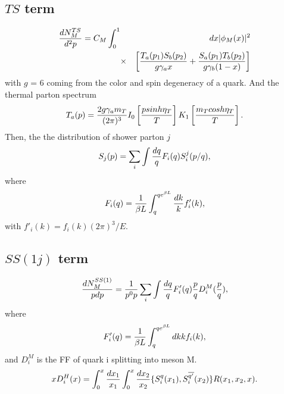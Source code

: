 \documentclass[twocolumn,aps,superscriptaddress,nofootinbib,floatfix]{revtex4}
\begin{document}
\subsection{$TS$ term}
\begin{eqnarray}
	\frac{dN^{TS}_{M}}{d^2p}=C_M\int_{0}^{1}&&dx \vert \phi_M(x)\vert^2 \\ 
	&\times &\left[{T_a(p_1)S_b(p_2)\over g\gamma_a x}+{S_a(p_1)T_b(p_2)\over g\gamma_b (1-x)}\right] \nonumber
\end{eqnarray}
with $g$ = 6 coming from the color and spin degeneracy of a quark. And the thermal parton spectrum
\begin{eqnarray}
	T_a(p)={2g\gamma_a m_T \over (2\pi)^3}I_0\left[\frac{psinh\eta_T}{T}\right]K_1\left[\frac{m_T cosh\eta_T}{T}\right].
\end{eqnarray}
Then, the  the distribution of shower parton $j$
\begin{eqnarray}
	S_j(p)=\sum_i \int {dq\over q}F_i(q)S_i^j(p/q),
\end{eqnarray}
where
\begin{eqnarray}
	F_i(q)={1\over \beta L}\int_{q}^{q e^{\beta L}} {dk\over k}f'_i(k),
\end{eqnarray}
with $f'_i(k)=f_i(k) (2\pi)^3/E$.

\subsection{$SS(1j)$ term}
\begin{eqnarray}
	\frac{dN^{SS(1)}_{M}}{pdp}={1\over p^0p}\sum_i \int {dq\over q}F'_i(q)
	{p\over q}D_i^M({p\over q}),	
\end{eqnarray}
where
\begin{eqnarray}
	F'_i(q)={1\over \beta L}\int_{q}^{q e^{\beta L}} dkk f_i(k),
\end{eqnarray}
and $D_i^M$ is the FF of quark i splitting into meson M.
\begin{eqnarray}
	xD_i^H(x)=\int_0^x {dx_1 \over x_1}\int_0^x {dx_2 \over x_2} \{S_i^q(x_1),S_i^{\overline{q'}} (x_2)\}R(x_1,x_2,x).
\end{eqnarray}
\end{document}
